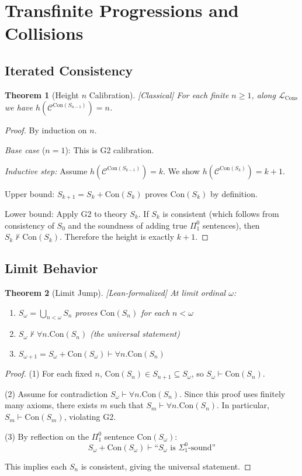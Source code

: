 \documentclass[11pt]{article}
\newtheorem{theorem}{Theorem}[section]
\newcommand{\Con}{\mathrm{Con}}
\newcommand{\LCons}{\mathcal{L}_{\mathrm{Cons}}}
\newcommand{\leanok}{\textsf{\textcolor{green!70!black}{[Lean-formalized]}}}
\newcommand{\leancited}{\textsf{\textcolor{blue!70!black}{[Classical]}}}
\begin{document}
\section{Transfinite Progressions and Collisions}

\subsection{Iterated Consistency}

\begin{theorem}[Height $n$ Calibration] \leancited
For each finite $n\ge 1$, along $\LCons$ we have $h(\mathcal C^{\Con(S_{n-1})}) = n$.
\end{theorem}

\begin{proof}
By induction on $n$.

\emph{Base case} ($n=1$): This is G2 calibration.

\emph{Inductive step:} Assume $h(\mathcal C^{\Con(S_{k-1})}) = k$. We show $h(\mathcal C^{\Con(S_k)}) = k+1$.

Upper bound: $S_{k+1} = S_k + \Con(S_k)$ proves $\Con(S_k)$ by definition.

Lower bound: Apply G2 to theory $S_k$. If $S_k$ is consistent (which follows from consistency of $S_0$ and the soundness of adding true $\Pi^0_1$ sentences), then $S_k \nvdash \Con(S_k)$. Therefore the height is exactly $k+1$.
\end{proof}

\subsection{Limit Behavior}

\begin{theorem}[Limit Jump] \leanok
At limit ordinal $\omega$:
\begin{enumerate}
\item $S_\omega = \bigcup_{n<\omega} S_n$ proves $\Con(S_n)$ for each $n<\omega$
\item $S_\omega \nvdash \forall n.\Con(S_n)$ (the universal statement)
\item $S_{\omega+1} = S_\omega + \Con(S_\omega) \vdash \forall n.\Con(S_n)$
\end{enumerate}
\end{theorem}

\begin{proof}
(1) For each fixed $n$, $\Con(S_n) \in S_{n+1} \subseteq S_\omega$, so $S_\omega \vdash \Con(S_n)$.

(2) Assume for contradiction $S_\omega \vdash \forall n.\Con(S_n)$. Since this proof uses finitely many axioms, there exists $m$ such that $S_m \vdash \forall n.\Con(S_n)$. In particular, $S_m \vdash \Con(S_m)$, violating G2.

(3) By reflection on the $\Pi^0_1$ sentence $\Con(S_\omega)$:
$$S_{\omega} + \Con(S_\omega) \vdash \text{``}S_\omega \text{ is } \Sigma^0_1\text{-sound''}$$

This implies each $S_n$ is consistent, giving the universal statement.
\end{proof}
\end{document}
